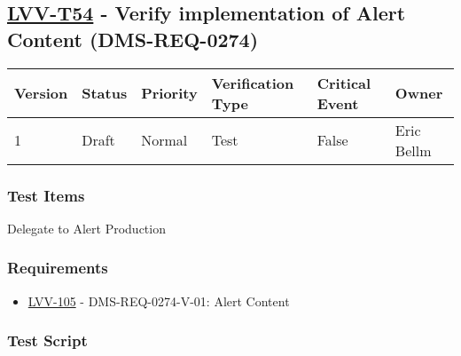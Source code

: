 \hypertarget{lvv-t54---verify-implementation-of-alert-content-dms-req-0274}{%
\subsection{\texorpdfstring{\href{https://jira.lsstcorp.org/secure/Tests.jspa\#/testCase/LVV-T54}{LVV-T54}
- Verify implementation of Alert Content
(DMS-REQ-0274)}{LVV-T54 - Verify implementation of Alert Content (DMS-REQ-0274)}}\label{lvv-t54---verify-implementation-of-alert-content-dms-req-0274}}

\begin{longtable}[]{@{}llllll@{}}
\toprule
Version & Status & Priority & Verification Type & Critical Event &
Owner\tabularnewline
\midrule
\endhead
1 & Draft & Normal & Test & False & Eric Bellm\tabularnewline
\bottomrule
\end{longtable}

\hypertarget{test-items-143}{%
\subsubsection{Test Items}\label{test-items-143}}

Delegate to Alert Production

\hypertarget{requirements-144}{%
\subsubsection{Requirements}\label{requirements-144}}

\begin{itemize}
\tightlist
\item
  \href{https://jira.lsstcorp.org/browse/LVV-105}{LVV-105} -
  DMS-REQ-0274-V-01: Alert Content
\end{itemize}

\hypertarget{test-script-144}{%
\subsubsection{Test Script}\label{test-script-144}}

